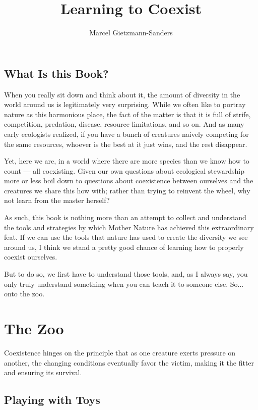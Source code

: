 \documentclass[11pt,a5paper]{book}
\title{Learning to Coexist}
\author{Marcel Gietzmann-Sanders}
\date{}
\begin{document}
\maketitle
\tableofcontents
\newpage
\chapter{What Is this Book?}

When you really sit down and think about it, the amount of diversity in the world around us is legitimately very surprising. While we often like to portray nature as this harmonious place, the fact of the matter is that it is full of strife, competition, predation, disease, resource limitations, and so on. And as many early ecologists realized, if you have a bunch of creatures naively competing for the same resources, whoever is the best at it just wins, and the rest disappear.

Yet, here we are, in a world where there are more species than we know how to count — all coexisting. Given our own questions about ecological stewardship more or less boil down to questions about coexistence between ourselves and the creatures we share this how with; rather than trying to reinvent the wheel, why not learn from the master herself? \newline

As such, this book is nothing more than an attempt to collect and understand the tools and strategies by which Mother Nature has achieved this extraordinary feat. If we can use the tools that nature has used to create the diversity we see around us, I think we stand a pretty good chance of learning how to properly coexist ourselves.

But to do so, we first have to understand those tools, and, as I always say, you only truly understand something when you can teach it to someone else. So... onto the zoo. 

\part{The Zoo}

Coexistence hinges on the principle that as one creature exerts pressure on another, the changing conditions eventually favor the victim, making it the fitter and ensuring its survival. 

\chapter{Playing with Toys}
\end{document}
